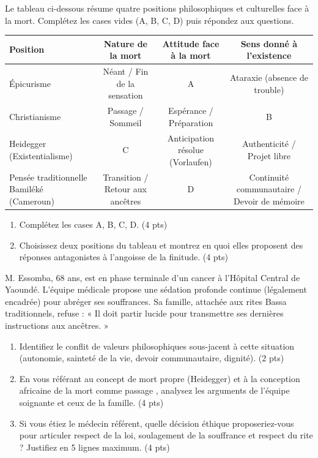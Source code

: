 \documentclass[11pt]{article}
\begin{document}
\begin{exercice}
Le tableau ci-dessous résume quatre positions philosophiques et culturelles face à la mort. Complétez les cases vides (A, B, C, D) puis répondez aux questions.
\begin{center}
\begin{tabularx}{\linewidth}{|X|c|c|c|}
\hline
\textbf{Position} & \textbf{Nature de la mort} & \textbf{Attitude face à la mort} & \textbf{Sens donné à l'existence} \\
\hline
Épicurisme & Néant / Fin de la sensation & A & Ataraxie (absence de trouble) \\
\hline
Christianisme & Passage / Sommeil & Espérance / Préparation & B \\
\hline
Heidegger (Existentialisme) & C & Anticipation résolue (Vorlaufen) & Authenticité / Projet libre \\
\hline
Pensée traditionnelle Bamiléké (Cameroun) & Transition / Retour aux ancêtres & D & Continuité communautaire / Devoir de mémoire \\
\hline
\end{tabularx}
\end{center}
\begin{enumerate}
    \item Complétez les cases A, B, C, D. (4 pts)
    \item Choisissez deux positions du tableau et montrez en quoi elles proposent des réponses antagonistes à l'angoisse de la finitude. (4 pts)
\end{enumerate}
\end{exercice}

\begin{exercice}
M. Essomba, 68 ans, est en phase terminale d'un cancer à l'Hôpital Central de Yaoundé. L'équipe médicale propose une sédation profonde continue (légalement encadrée) pour abréger ses souffrances. Sa famille, attachée aux rites Bassa traditionnels, refuse : « Il doit partir lucide pour transmettre ses dernières instructions aux ancêtres. »
\begin{enumerate}
    \item Identifiez le conflit de valeurs philosophiques sous-jacent à cette situation (autonomie, sainteté de la vie, devoir communautaire, dignité). (2 pts)
    \item En vous référant au concept de \og mort propre \fg{} (Heidegger) et à la conception africaine de la mort comme \og passage \fg{}, analysez les arguments de l'équipe soignante et ceux de la famille. (4 pts)
    \item Si vous étiez le médecin référent, quelle décision éthique proposeriez-vous pour articuler respect de la loi, soulagement de la souffrance et respect du rite ? Justifiez en 5 lignes maximum. (4 pts)
\end{enumerate}
\end{exercice}
\end{document}
